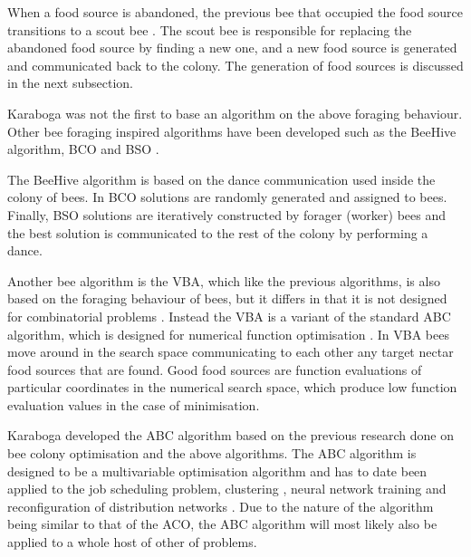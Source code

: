When a food source is abandoned, the previous bee that occupied the food source transitions to a scout bee \cite{ABCCompareStudy,ABCNumericalOptimization}. The scout bee is responsible for replacing the abandoned food source by finding a new one, and a new food source is generated and communicated back to the colony\cite{ABCCompareStudy,ABCImageEnhancement,ABCNumericalOptimization}. The generation of food sources is discussed in the next subsection.

Karaboga was not the first to base an algorithm on the above foraging behaviour. Other bee foraging inspired algorithms have been developed such as the BeeHive algorithm, \gls{BCO} and \gls{BSO} \cite{BCO,HybridABCClustering,ABCNumericalOptimization}. 

The BeeHive algorithm is based on the dance communication used inside the colony of bees. In \gls{BCO} solutions are randomly generated and assigned to bees\cite{HybridABCClustering,ABCNumericalOptimization}. Finally, \gls{BSO} solutions are iteratively constructed by forager (worker) bees and the best solution is communicated to the rest of the colony by performing a dance\cite{HybridABCClustering,ABCNumericalOptimization}.

Another bee algorithm is the \gls{VBA}, which like the previous algorithms, is also based on the foraging behaviour of bees, but it differs in that it is not designed for combinatorial problems \cite{ABCNumericalOptimization}. Instead the \gls{VBA} is a variant of the standard \gls{ABC} algorithm, which is designed for numerical function optimisation \cite{ABCNumericalOptimization}. In \gls{VBA} bees move around in the search space communicating to each other any target nectar food sources that are found\cite{ABCNumericalOptimization}. Good food sources are function evaluations of particular coordinates in the numerical search space, which produce low function evaluation values in the case of minimisation\cite{ABCNumericalOptimization}.

Karaboga developed the \gls{ABC} algorithm based on the previous research done on bee colony optimisation and the above algorithms. The \gls{ABC} algorithm is designed to be a multivariable optimisation algorithm and has to date been applied to the job scheduling problem, clustering \cite{HybridABCClustering}, neural network training and reconfiguration of distribution networks \cite{ABCReconfigDistro}. Due to the nature of the algorithm being similar to that of the \gls{ACO}, the \gls{ABC} algorithm will most likely also be applied to a whole host of other of problems.

